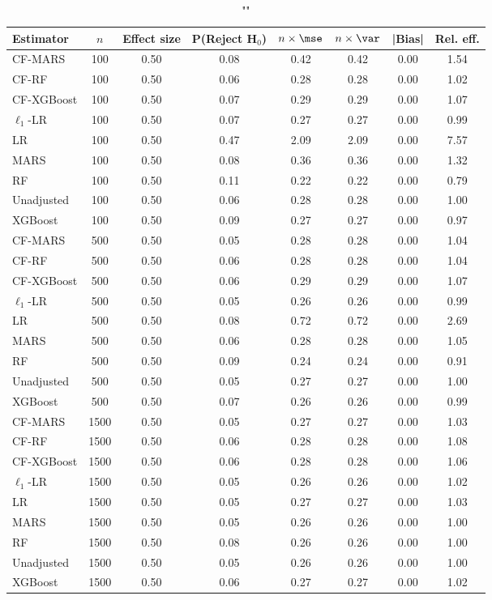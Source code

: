 \begin{table}
\centering
\caption{""}
\begin{tabular}{lccccccc}
\toprule
Estimator & $n$ & Effect size & P(Reject H$_0$) & $n\times\mse$ & $n\times \var$ & |Bias| & Rel. eff.\\ \midrule
CF-MARS & 100 & 0.50 & 0.08 & 0.42 & 0.42 & 0.00 & 1.54 \\ 
CF-RF & 100 & 0.50 & 0.06 & 0.28 & 0.28 & 0.00 & 1.02 \\ 
CF-XGBoost & 100 & 0.50 & 0.07 & 0.29 & 0.29 & 0.00 & 1.07 \\ 
$\ell_1$-LR & 100 & 0.50 & 0.07 & 0.27 & 0.27 & 0.00 & 0.99 \\ 
LR & 100 & 0.50 & 0.47 & 2.09 & 2.09 & 0.00 & 7.57 \\ 
MARS & 100 & 0.50 & 0.08 & 0.36 & 0.36 & 0.00 & 1.32 \\ 
RF & 100 & 0.50 & 0.11 & 0.22 & 0.22 & 0.00 & 0.79 \\ 
Unadjusted & 100 & 0.50 & 0.06 & 0.28 & 0.28 & 0.00 & 1.00 \\ 
XGBoost & 100 & 0.50 & 0.09 & 0.27 & 0.27 & 0.00 & 0.97 \\ \addlinespace 
CF-MARS & 500 & 0.50 & 0.05 & 0.28 & 0.28 & 0.00 & 1.04 \\ 
CF-RF & 500 & 0.50 & 0.06 & 0.28 & 0.28 & 0.00 & 1.04 \\ 
CF-XGBoost & 500 & 0.50 & 0.06 & 0.29 & 0.29 & 0.00 & 1.07 \\ 
$\ell_1$-LR & 500 & 0.50 & 0.05 & 0.26 & 0.26 & 0.00 & 0.99 \\ 
LR & 500 & 0.50 & 0.08 & 0.72 & 0.72 & 0.00 & 2.69 \\ 
MARS & 500 & 0.50 & 0.06 & 0.28 & 0.28 & 0.00 & 1.05 \\ 
RF & 500 & 0.50 & 0.09 & 0.24 & 0.24 & 0.00 & 0.91 \\ 
Unadjusted & 500 & 0.50 & 0.05 & 0.27 & 0.27 & 0.00 & 1.00 \\ 
XGBoost & 500 & 0.50 & 0.07 & 0.26 & 0.26 & 0.00 & 0.99 \\ \addlinespace 
CF-MARS & 1500 & 0.50 & 0.05 & 0.27 & 0.27 & 0.00 & 1.03 \\ 
CF-RF & 1500 & 0.50 & 0.06 & 0.28 & 0.28 & 0.00 & 1.08 \\ 
CF-XGBoost & 1500 & 0.50 & 0.06 & 0.28 & 0.28 & 0.00 & 1.06 \\ 
$\ell_1$-LR & 1500 & 0.50 & 0.05 & 0.26 & 0.26 & 0.00 & 1.02 \\ 
LR & 1500 & 0.50 & 0.05 & 0.27 & 0.27 & 0.00 & 1.03 \\ 
MARS & 1500 & 0.50 & 0.05 & 0.26 & 0.26 & 0.00 & 1.00 \\ 
RF & 1500 & 0.50 & 0.08 & 0.26 & 0.26 & 0.00 & 1.00 \\ 
Unadjusted & 1500 & 0.50 & 0.05 & 0.26 & 0.26 & 0.00 & 1.00 \\ 
XGBoost & 1500 & 0.50 & 0.06 & 0.27 & 0.27 & 0.00 & 1.02 \\
\bottomrule
\end{tabular}
\end{table}
